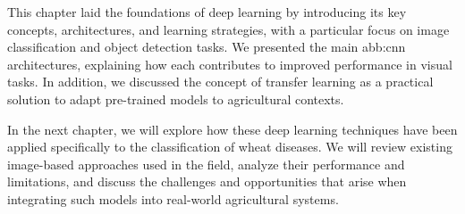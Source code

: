 This chapter laid the foundations of deep learning by introducing its key concepts, architectures, and learning strategies, with a particular focus on image classification and object detection tasks. We presented the main \gls{abb:cnn} architectures, explaining how each contributes to improved performance in visual tasks. In addition, we discussed the concept of transfer learning as a practical solution to adapt pre-trained models to agricultural contexts.

In the next chapter, we will explore how these deep learning techniques have been applied specifically to the classification of wheat diseases. We will review existing image-based approaches used in the field, analyze their performance and limitations, and discuss the challenges and opportunities that arise when integrating such models into real-world agricultural systems.
